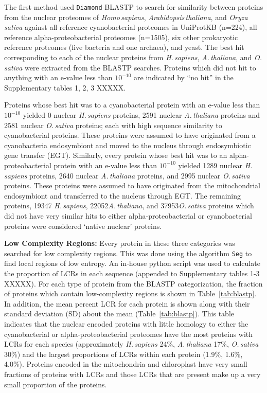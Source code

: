 \documentclass[a4paper,12pt]{article}
\newcommand{\arab}{\mbox{\textit{Arabidopsis\,thaliana}}\xspace}
\newcommand{\ath}{\mbox{\textit{A.\,thaliana}}\xspace}
\newcommand{\oryz}{\mbox{\textit{Oryza\,sativa}}\xspace}
\newcommand{\osa}{\mbox{\textit{O.\,sativa}}\xspace}
\newcommand{\homo}{\mbox{\textit{Homo\,sapiens}}\xspace}
\newcommand{\hsa}{\mbox{\textit{H.\,sapiens}}\xspace}
\renewcommand{\diamond}{\mbox{\texttt{Diamond}}\xspace}
\newcommand{\missing}{{\color{red}XXXXX}\xspace}
\newcommand{\humanNucNumberBlastP}{19347\xspace}
\newcommand{\humanNucMitoNoBlastP}{1289\xspace}
\newcommand{\arabNucNumberBlastP}{22052\xspace}
\newcommand{\arabNucMitoNoBlastP}{2640\xspace}
\newcommand{\arabNucChloNoBlastP}{2591\xspace}
\newcommand{\oryzNucNumberBlastP}{37953\xspace}
\newcommand{\oryzNucMitoNoBlastP}{2995\xspace}
\newcommand{\oryzNucChloNoBlastP}{2581\xspace}
\begin{document}
\begin{multicols}{2}
The first method used \diamond BLASTP to search for similarity between
proteins from the nuclear proteomes of \homo, \arab, and \oryz against all
reference cyano\-bacterial proteomes in UniProtKB (n=224), all reference
alpha-proteobacterial proteomes (n=1505), six other prokaryotic reference
proteomes (five bacteria and one archaea), and yeast. The best hit
corresponding to each of the nuclear proteins from \hsa, \ath, and \osa
were extracted from the BLASTP searches.  Proteins which did not hit to
anything with an e-value less than $10^{-10}$ are indicated by ``no hit''
in the Supplementary tables 1, 2, 3 \missing.  

Proteins whose best hit was to a cyano\-bacterial protein with an e-value
less than $10^{-10}$ yielded 0 nuclear \hsa proteins, \arabNucChloNoBlastP
nuclear \ath proteins and \oryzNucChloNoBlastP nuclear \osa proteins; each
with high sequence similarity to cyanobacterial proteins. These proteins
were assumed to have originated from a cyanobacteria endosymbiont and
moved to the nucleus through endosymbiotic gene transfer (EGT). Similarly,
every protein whose best hit was to an alpha-proteobacterial protein
with an e-value less than $10^{-10}$ yielded \humanNucMitoNoBlastP
nuclear \hsa proteins, \arabNucMitoNoBlastP nuclear \ath proteins, and
\oryzNucMitoNoBlastP nuclear \osa proteins. These proteins were assumed
to have originated from the mitochondrial endosymbiont and transferred
to the nucleus through EGT. The remaining proteins, \humanNucNumberBlastP
\hsa, \arabNucNumberBlastP \ath, and \oryzNucNumberBlastP \osa proteins
which did not have very similar hits to either alpha-proteobacterial or
cyanobacterial proteins were considered `native nuclear' proteins.

\textbf{Low Complexity Regions:}
Every protein in these three categories was searched for low complexity
regions.  This was done using the algorithm \texttt{Seg} to find local
regions of low entropy. An in-house python script was used to calculate
the proportion of LCRs in each sequence (appended to Supplementary tables
1-3 \missing). For each type of protein from the BLASTP categorization,
the fraction of proteins which contain low-complexity regions is shown
in Table~\ref{tab:blastp}.  In addition, the mean percent LCR for each
protein is shown along with their standard deviation (SD) about the
mean (Table~\ref{tab:blastp}).  This table indicates that the nuclear
encoded proteins with little homology to either the cyanobacterial
or alpha-proteobacterial proteomes have the most proteins with LCRs
for each species (approximately \hsa 24\%, \ath 17\%, \osa 30\%) and the
largest proportions of LCRs within each protein (1.9\%, 1.6\%, 4.0\%).
Proteins encoded in the mitochondria and chloroplast have very small
fractions of proteins with LCRs and those LCRs that are present make up
a very small proportion of the proteins.




\end{multicols}
\end{document}
